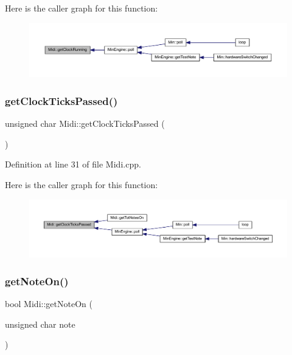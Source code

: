 Here is the caller graph for this function\+:
\nopagebreak
\begin{figure}[H]
\begin{center}
\leavevmode
\includegraphics[width=350pt]{da/db9/class_midi_ad4330bfa4bc5e7342eed4b083fcae837_icgraph}
\end{center}
\end{figure}
\mbox{\label{class_midi_aaa7e1badd1370989aad99509b95b343b}} 
\subsubsection{\texorpdfstring{get\+Clock\+Ticks\+Passed()}{getClockTicksPassed()}}
{\footnotesize\ttfamily unsigned char Midi\+::get\+Clock\+Ticks\+Passed (\begin{DoxyParamCaption}{ }\end{DoxyParamCaption})}



Definition at line 31 of file Midi.\+cpp.

Here is the caller graph for this function\+:
\nopagebreak
\begin{figure}[H]
\begin{center}
\leavevmode
\includegraphics[width=350pt]{da/db9/class_midi_aaa7e1badd1370989aad99509b95b343b_icgraph}
\end{center}
\end{figure}
\mbox{\label{class_midi_a7e93abeb7622eeaa7dbe8480de030d0b}} 
\subsubsection{\texorpdfstring{get\+Note\+On()}{getNoteOn()}}
{\footnotesize\ttfamily bool Midi\+::get\+Note\+On (\begin{DoxyParamCaption}\item[{unsigned char}]{note }\end{DoxyParamCaption})\hspace{0.3cm}{\ttfamily [inline]}}



